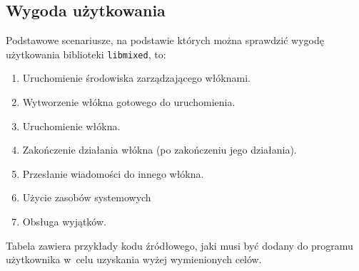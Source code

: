 \documentclass[12pt]{mwart}
\newcommand{\code}{\texttt}
\newcounter{tabmain}
\begin{document}
\subsection{Wygoda użytkowania}
\indent
  Podstawowe scenariusze, na podstawie których można sprawdzić wygodę użytkowania biblioteki \code{libmixed}, to:
  \begin{enumerate}
    \item Uruchomienie środowiska zarządzającego włóknami.
    \item Wytworzenie włókna gotowego do uruchomienia.
    \item Uruchomienie włókna.
    \item Zakończenie działania włókna (po zakończeniu jego działania).
    \item Przesłanie wiadomości do innego włókna.
    \item Użycie zasobów systemowych
    \item Obsługa wyjątków.
  \end{enumerate}
   \setcounter{mixedpthread}{\value{tabmain}}
\indent
  Tabela  zawiera przykłady kodu źródłowego, jaki musi być dodany do programu użytkownika w~celu uzyskania
  wyżej wymienionych celów.
\par
\end{document}
